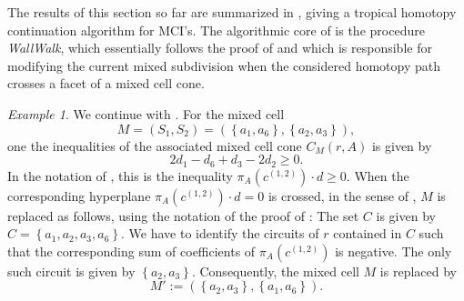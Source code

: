 \documentclass[a4paper]{article}
\theoremstyle{remark}
\newtheorem{example}{Example}
\newcommand{\set}[1]{\left\{#1\right\}}
\begin{document}
The results of this section so far are summarized in , giving
a tropical homotopy continuation algorithm for MCI's. The algorithmic core
of  is the procedure \textit{WallWalk}, which essentially follows
the proof of  and which is responsible for modifying
the current mixed subdivision when the considered homotopy path crosses a facet
of a mixed cell cone.

\begin{example}
  We continue with . For the mixed cell
  \[M = (S_1,S_2) = (\set{a_1,a_6}, \set{a_2,a_3}),\]
  one the inequalities of the associated mixed cell cone $C_M(r,A)$
  is given by
  \[2d_1 - d_6 + d_3 - 2d_2 \geq 0.\] In the notation of
  , this is the inequality
  $\pi_A(c^{(1,2)}) \cdot d \geq 0$. When the corresponding hyperplane
  $\pi_A(c^{(1,2)}) \cdot d = 0$ is crossed, in the sense of
  , $M$ is replaced as follows, using the
  notation of the proof of : The set
  $C$ is given by $C = \set{a_1,a_2,a_3,a_6}$. We have to identify
  the circuits of $r$ contained in $C$ such that the corresponding
  sum of coefficients of $\pi_A(c^{(1,2)})$ is negative. The only
  such circuit is given by $\set{a_2,a_3}$. Consequently, the mixed
  cell $M$ is replaced by
  \[M' := (\set{a_2,a_3}, \set{a_1,a_6}).\]
\end{example}
\end{document}
